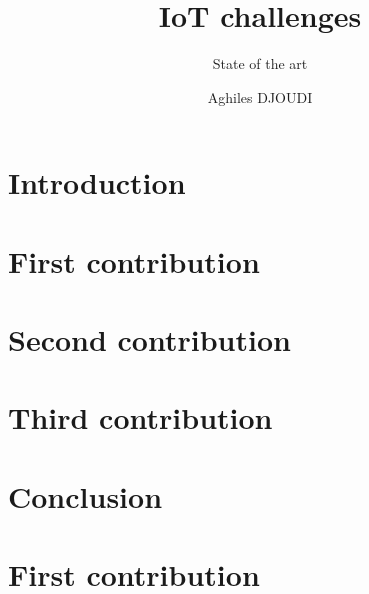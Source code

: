 \documentclass[8pt]{beamer}
\title{IoT challenges}
\subtitle{State of the art}
\author{Aghiles DJOUDI}
\institute{PhD student\\ LIGM/ESIEE Paris \& SIC/ECE Paris}
\begin{document}
\firstpage

\section{Introduction}
	

\tableofcontent

\section{First contribution}
	
	
	
	
	

\section{Second contribution}
	
	
	
	
	

\section{Third contribution}
	
	
	
	
	

\section{Conclusion}
	


\section{First contribution}
	
	
	
	
	




\frameBibliography
\end{document}

